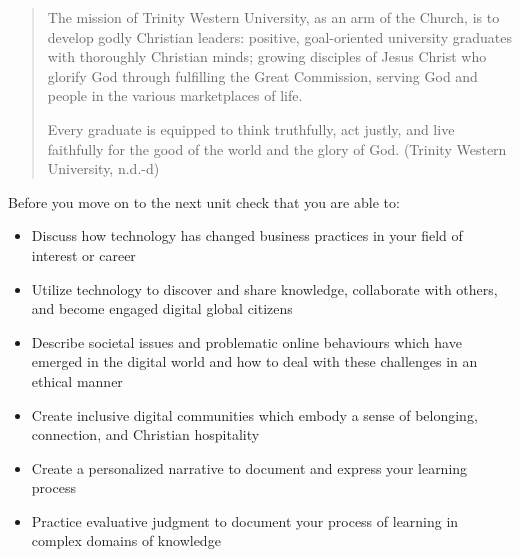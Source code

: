 \documentclass[
  letterpaper,
  DIV=11,
  numbers=noendperiod]{scrreprt}
\providecommand{\tightlist}{%
  \setlength{\itemsep}{0pt}\setlength{\parskip}{0pt}}\usepackage{longtable,booktabs,array}
\begin{document}
\begin{quote}
The mission of Trinity Western University, as an arm of the Church, is
to develop godly Christian leaders: positive, goal-oriented university
graduates with thoroughly Christian minds; growing disciples of Jesus
Christ who glorify God through fulfilling the Great Commission, serving
God and people in the various marketplaces of life.

Every graduate is equipped to think truthfully, act justly, and live
faithfully for the good of the world and the glory of God. (Trinity
Western University, n.d.-d)
\end{quote}

\begin{tcolorbox}[enhanced jigsaw, toprule=.15mm, colback=white, colframe=quarto-callout-note-color-frame, bottomtitle=1mm, leftrule=.75mm, coltitle=black, titlerule=0mm, rightrule=.15mm, colbacktitle=quarto-callout-note-color!10!white, left=2mm, title={Checking Your Learning}, opacitybacktitle=0.6, opacityback=0, breakable, toptitle=1mm, arc=.35mm, bottomrule=.15mm]

Before you move on to the next unit check that you are able to:

\begin{itemize}
\tightlist
\item
  Discuss how technology has changed business practices in your field of
  interest or career
\item
  Utilize technology to discover and share knowledge, collaborate with
  others, and become engaged digital global citizens
\item
  Describe societal issues and problematic online behaviours which have
  emerged in the digital world and how to deal with these challenges in
  an ethical manner
\item
  Create inclusive digital communities which embody a sense of
  belonging, connection, and Christian hospitality
\item
  Create a personalized narrative to document and express your learning
  process
\item
  Practice evaluative judgment to document your process of learning in
  complex domains of knowledge
\end{itemize}

\end{tcolorbox}
\end{document}
